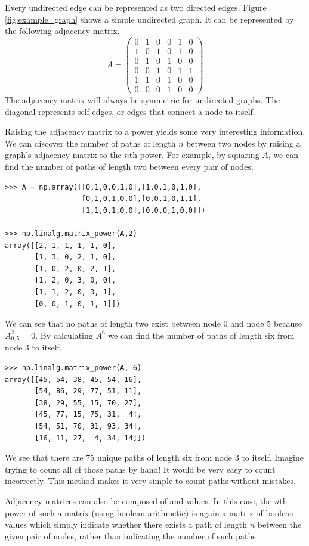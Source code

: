 Every undirected edge can be represented as two directed edges.
Figure \ref{fig:example_graph} shows a simple undirected graph.
It can be represented by the following adjacency matrix.
\[
A = \begin{pmatrix}
0 & 1 & 0 & 0 & 1 & 0\\
1 & 0 & 1 & 0 & 1 & 0\\
0 & 1 & 0 & 1 & 0 & 0\\
0 & 0 & 1 & 0 & 1 & 1\\
1 & 1 & 0 & 1 & 0 & 0\\
0 & 0 & 0 & 1 & 0 & 0
\end{pmatrix}
\]
The adjacency matrix will always be symmetric for undirected graphs.
The diagonal represents self-edges, or edges that connect a node to itself.

Raising the adjacency matrix to a power yields some very interesting information.
We can discover the number of paths of length $n$ between two nodes by raising a graph's adjacency matrix to the $n$th power.
For example, by squaring $A$, we can find the number of paths of length two between every pair of nodes.
\begin{lstlisting}
>>> A = np.array([[0,1,0,0,1,0],[1,0,1,0,1,0],
                  [0,1,0,1,0,0],[0,0,1,0,1,1],
                  [1,1,0,1,0,0],[0,0,0,1,0,0]])

>>> np.linalg.matrix_power(A,2)
array([[2, 1, 1, 1, 1, 0],
       [1, 3, 0, 2, 1, 0],
       [1, 0, 2, 0, 2, 1],
       [1, 2, 0, 3, 0, 0],
       [1, 1, 2, 0, 3, 1],
       [0, 0, 1, 0, 1, 1]])
\end{lstlisting}
We can see that no paths of length two exist between node 0 and node 5 because $A^2_{0,5} = 0$.
By calculating $A^6$ we can find the number of paths of length six from node 3 to itself.
\begin{lstlisting}
>>> np.linalg.matrix_power(A, 6)
array([[45, 54, 38, 45, 54, 16],
       [54, 86, 29, 77, 51, 11],
       [38, 29, 55, 15, 70, 27],
       [45, 77, 15, 75, 31,  4],
       [54, 51, 70, 31, 93, 34],
       [16, 11, 27,  4, 34, 14]])
\end{lstlisting}
We see that there are 75 unique paths of length six from node 3 to itself.
Imagine trying to count all of those paths by hand!
It would be very easy to count incorrectly.
This method makes it very simple to count paths without mistakes.

Adjacency matrices can also be composed of  and  values.
In this case, the $n$th power of such a matrix (using boolean arithmetic)
is again a matrix of
boolean values which simply indicate whether there exists a path of length $n$ between the given pair of nodes, rather than indicating the number of such
paths.

